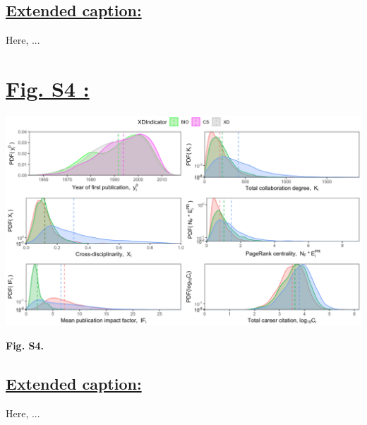 \documentclass{article}\usepackage[]{graphicx}\usepackage[]{color}
\begin{document}
\subsection*{\underline{Extended caption:}}
\par{Here, ...}

\newpage
\section*{\underline{Fig. S4 :}}
\begin{center}
\includegraphics[scale=0.4]{3_ggplot.png}
\newline
\par{\textbf{Fig. S4.}}
\end{center}
\subsection*{\underline{Extended caption:}}
\par{Here, ...}
\end{document}
